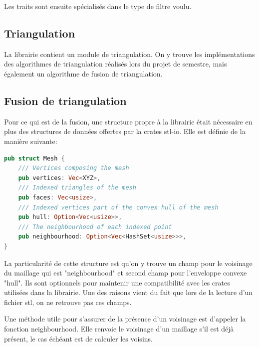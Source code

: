Les traits sont ensuite spécialisés dans le type de filtre voulu.
\subsection{Triangulation}
La librairie contient un module de triangulation.
On y trouve les implémentations des algorithmes de triangulation réalisés lors du projet de semestre, mais également un algorithme de  fusion de triangulation.

\subsection{Fusion de triangulation}
Pour ce qui est de la fusion, une structure propre à la librairie était nécessaire en plus des structures de données offertes par la crates stl-io.
Elle est définie de la manière suivante:
\begin{lstlisting}[language=Rust, style=boxed]
pub struct Mesh {
    /// Vertices composing the mesh
    pub vertices: Vec<XYZ>,
    /// Indexed triangles of the mesh
    pub faces: Vec<usize>,
    /// Indexed vertices part of the convex hull of the mesh
    pub hull: Option<Vec<usize>>,
    /// The neighbourhood of each indexed point
    pub neighbourhood: Option<Vec<HashSet<usize>>>,
}
\end{lstlisting}

La particularité de cette structure est qu'on y trouve un champ pour le voisinage du maillage qui est "neighbourhood" et second champ pour l'enveloppe convexe "hull".
Ils sont optionnels pour maintenir une compatibilité avec les crates utilisées dans la librairie.
Une des raisons vient du fait que lors de la lecture d'un fichier \gls{stl}, on ne retrouve pas ces champs. 

Une méthode utile pour s'assurer de la présence d'un voisinage est d'appeler la fonction neighbourhood. Elle renvoie le voisinage d'un maillage s'il est déjà présent, le cas échéant est de calculer les voisins.

